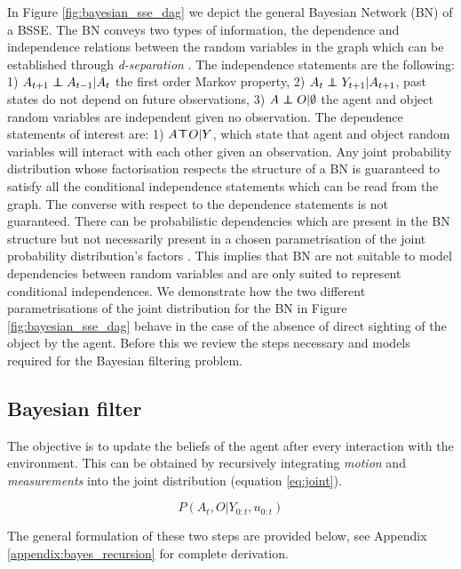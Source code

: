 \documentclass[review]{elsarticle}
\numberwithin{equation}{section}
\begin{document}
In Figure \ref{fig:bayesian_sse_dag} we depict the general Bayesian Network (BN) of a BSSE. The BN conveys two types of
information, the dependence and independence relations between the random variables in the graph which can be established
through \textit{d-separation} \cite{BayesBall}. The independence statements are the following: 1) $A_{t+1} \independent A_{t-1} | A_t$ the 
first order Markov property, 2) $A_{t} \independent Y_{t+1} | A_{t+1}$, past states do not depend on future observations, 
3) $A \independent O | \emptyset$ the agent and object random variables
are independent given no observation. The dependence statements of interest are: 1) $A \dependent O | Y$, which 
state that agent and object random variables will interact with each other given an observation. Any joint probability 
distribution whose factorisation  respects the structure of a BN is guaranteed to satisfy all the conditional independence 
statements which can be read from the graph. The converse with respect to the dependence statements is not guaranteed. There 
can be probabilistic dependencies which are present in the BN structure but not necessarily present in a chosen parametrisation 
of the joint probability distribution's factors \cite[p.43]{barberBRML2012}. This implies that BN are not suitable to model 
dependencies between random variables and are only suited to represent conditional independences. We demonstrate 
how the two different parametrisations of the joint distribution for the BN in Figure \ref{fig:bayesian_sse_dag} 
behave in the case of the absence of direct sighting of the object by the agent. Before this we review the steps necessary 
and models required for the Bayesian filtering problem.

\subsection{Bayesian filter}

The objective is to update the beliefs of the agent after every interaction with the environment. 
This can be obtained by recursively integrating \textit{motion} and \textit{measurements} into the joint distribution (equation \ref{eq:joint}).

\begin{equation}
 P(A_t,O|Y_{0:t},u_{0:t}) 
 \label{eq:joint}
\end{equation}

The general formulation of these two steps are provided below, see Appendix \ref{appendix:bayes_recursion} for complete derivation.
\end{document}
